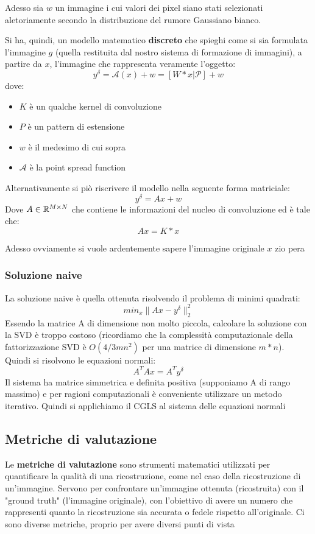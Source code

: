 Adesso sia $w$ un immagine i cui valori dei pixel siano stati selezionati aletoriamente secondo la distribuzione del rumore Gaussiano bianco. 

Si ha, quindi, un modello matematico \textbf{discreto} che spieghi come si sia formulata l'immagine $g$ (quella restituita dal nostro sistema di formazione di immagini), a partire da $x$, l'immagine che rappresenta veramente l'oggetto:
\[
    y^\delta = \mathcal{A}(x) + w =  [W*x|\mathcal{P}] + w  
\]
dove: 
\begin{itemize}
    \item $K$ è un qualche kernel di convoluzione
    \item $P$ è un pattern di estensione 
    \item $w$ è il medesimo di cui sopra
    \item $\mathcal{A}$ è la point spread function
\end{itemize}

Alternativamente si piò riscrivere il modello nella seguente forma matriciale:
\[
    y^\delta = Ax + w    
\]
Dove $A\in\mathbb{R}^{M\times N}$ che contiene le informazioni del nucleo
di convoluzione ed è tale che:
\[
    Ax = K * x
\]

Adesso ovviamente si vuole ardentemente sapere l'immagine originale $x$ zio pera
\subsubsection{Soluzione naive}
La soluzione naive è quella ottenuta risolvendo il problema di minimi quadrati:
\[
    min_x \|Ax-y^\delta\|_2^2    
\]
Essendo la matrice A di dimensione non molto piccola, calcolare la soluzione con la SVD è troppo costoso (ricordiamo che la complessità computazionale della fattorizzazione SVD è $O(4/3mn^2 )$ per una matrice di dimensione $m*n$). Quindi si risolvono le equazioni
normali:
\[
    A^TAx=A^Ty^\delta    
\]
Il sistema ha matrice simmetrica e definita positiva (supponiamo A di rango massimo) e per ragioni computazionali è conveniente utilizzare un metodo iterativo. Quindi  si applichiamo il CGLS al sistema delle equazioni normali
\subsection{Metriche di valutazione}
Le \textbf{metriche di valutazione} sono strumenti matematici utilizzati per quantificare la qualità di una ricostruzione, come nel caso della ricostruzione di un'immagine. Servono per confrontare un'immagine ottenuta (ricostruita) con il "ground truth" (l'immagine originale), con l'obiettivo di avere un numero che rappresenti quanto la ricostruzione sia accurata o fedele rispetto all'originale. Ci sono diverse metriche, proprio per avere diversi punti di vista
